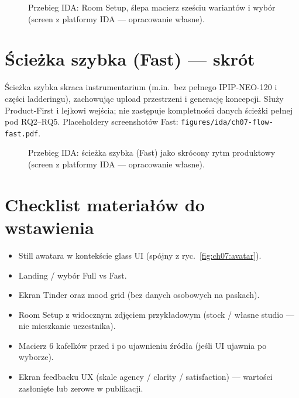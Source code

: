 \begin{figure}[htbp]
  \centering
  \caption{Przebieg IDA: Room Setup, ślepa macierz sześciu wariantów i wybór (screen z platformy IDA --- opracowanie własne).}
  \label{fig:app:h:matrix-seq}
\end{figure}

\section{Ścieżka szybka (Fast) --- skrót}
\label{app:h:sec:fast}

Ścieżka szybka skraca instrumentarium (m.in.\ bez pełnego IPIP-NEO-120 i części ladderingu), zachowując upload przestrzeni i generację koncepcji. Służy Product-First i lejkowi wejścia; nie zastępuje kompletności danych ścieżki pełnej pod RQ2--RQ5. Placeholdery screenshotów Fast: \texttt{figures/ida/ch07-flow-fast.pdf}.

\begin{figure}[htbp]
  \centering
  \caption{Przebieg IDA: ścieżka szybka (Fast) jako skrócony rytm produktowy (screen z platformy IDA --- opracowanie własne).}
  \label{fig:app:h:fast}
\end{figure}

\section{Checklist materiałów do wstawienia}
\label{app:h:sec:checklist}

\begin{itemize}
  \item Still awatara w kontekście glass UI (spójny z ryc.~\ref{fig:ch07:avatar}).
  \item Landing / wybór Full vs Fast.
  \item Ekran Tinder oraz mood grid (bez danych osobowych na paskach).
  \item Room Setup z widocznym zdjęciem przykładowym (stock / własne studio --- nie mieszkanie uczestnika).
  \item Macierz 6 kafelków przed i po ujawnieniu źródła (jeśli UI ujawnia po wyborze).
  \item Ekran feedbacku UX (skale agency / clarity / satisfaction) --- wartości zasłonięte lub zerowe w publikacji.
\end{itemize}
